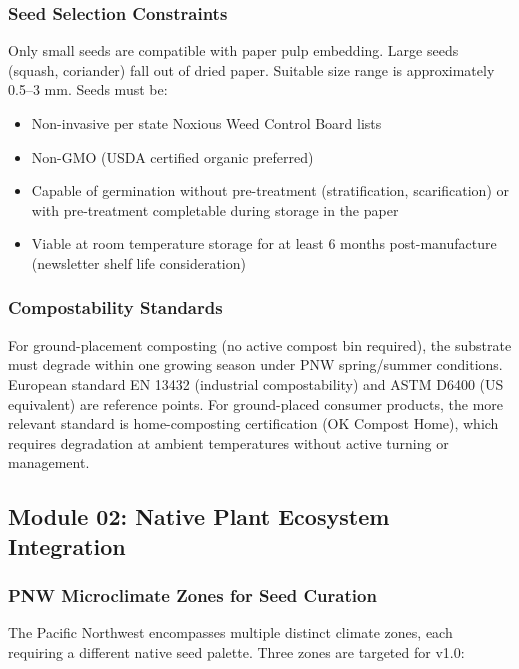 \documentclass[11pt,letterpaper]{article}
\begin{document}
\subsubsection{Seed Selection Constraints}
Only small seeds are compatible with paper pulp embedding. Large seeds (squash, coriander) fall out of dried paper. Suitable size range is approximately 0.5--3 mm. Seeds must be:
\begin{itemize}[leftmargin=1.5em]
  \item Non-invasive per state Noxious Weed Control Board lists
  \item Non-GMO (USDA certified organic preferred)
  \item Capable of germination without pre-treatment (stratification, scarification) or with pre-treatment completable during storage in the paper
  \item Viable at room temperature storage for at least 6 months post-manufacture (newsletter shelf life consideration)
\end{itemize}

\subsubsection{Compostability Standards}
For ground-placement composting (no active compost bin required), the substrate must degrade within one growing season under PNW spring/summer conditions. European standard EN 13432 (industrial compostability) and ASTM D6400 (US equivalent) are reference points. For ground-placed consumer products, the more relevant standard is home-composting certification (OK Compost Home), which requires degradation at ambient temperatures without active turning or management.

\subsection{Module 02: Native Plant Ecosystem Integration}

\subsubsection{PNW Microclimate Zones for Seed Curation}
The Pacific Northwest encompasses multiple distinct climate zones, each requiring a different native seed palette. Three zones are targeted for v1.0:
\end{document}
